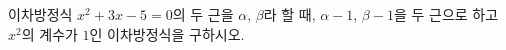 이차방정식 $x^2+3x-5=0$의 두 근을 $\alpha$, $\beta$라 할 때, $\alpha-1$, $\beta-1$을 두 근으로 하고 $x^2$의 계수가 $1$인 이차방정식을 구하시오.
